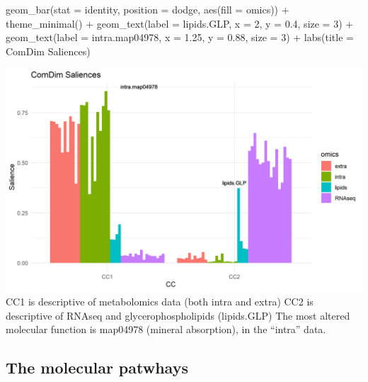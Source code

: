 \documentclass[
]{book}
\newenvironment{Shaded}{\begin{snugshade}}{\end{snugshade}}
\newcommand{\AttributeTok}[1]{\textcolor[rgb]{0.77,0.63,0.00}{#1}}
\newcommand{\DecValTok}[1]{\textcolor[rgb]{0.00,0.00,0.81}{#1}}
\newcommand{\FloatTok}[1]{\textcolor[rgb]{0.00,0.00,0.81}{#1}}
\newcommand{\FunctionTok}[1]{\textcolor[rgb]{0.00,0.00,0.00}{#1}}
\newcommand{\NormalTok}[1]{#1}
\newcommand{\SpecialCharTok}[1]{\textcolor[rgb]{0.00,0.00,0.00}{#1}}
\newcommand{\StringTok}[1]{\textcolor[rgb]{0.31,0.60,0.02}{#1}}
\begin{document}
\begin{Shaded}
\begin{Highlighting}[]
  \FunctionTok{geom\_bar}\NormalTok{(}\AttributeTok{stat =} \StringTok{\textquotesingle{}identity\textquotesingle{}}\NormalTok{, }\AttributeTok{position =} \StringTok{\textquotesingle{}dodge\textquotesingle{}}\NormalTok{,}
           \FunctionTok{aes}\NormalTok{(}\AttributeTok{fill =}\NormalTok{ omics)) }\SpecialCharTok{+}
  \FunctionTok{theme\_minimal}\NormalTok{() }\SpecialCharTok{+}
  \FunctionTok{geom\_text}\NormalTok{(}\AttributeTok{label =} \StringTok{\textquotesingle{}lipids.GLP\textquotesingle{}}\NormalTok{, }\AttributeTok{x =} \DecValTok{2}\NormalTok{, }\AttributeTok{y =} \FloatTok{0.4}\NormalTok{, }\AttributeTok{size =} \DecValTok{3}\NormalTok{) }\SpecialCharTok{+}
  \FunctionTok{geom\_text}\NormalTok{(}\AttributeTok{label =} \StringTok{\textquotesingle{}intra.map04978\textquotesingle{}}\NormalTok{, }\AttributeTok{x =} \FloatTok{1.25}\NormalTok{, }\AttributeTok{y =} \FloatTok{0.88}\NormalTok{, }\AttributeTok{size =} \DecValTok{3}\NormalTok{) }\SpecialCharTok{+}
  \FunctionTok{labs}\NormalTok{(}\AttributeTok{title =} \StringTok{\textquotesingle{}ComDim Saliences\textquotesingle{}}\NormalTok{)}
\end{Highlighting}
\end{Shaded}

\includegraphics{Figs/fig5_2.png}
CC1 is descriptive of metabolomics data (both intra and extra)
CC2 is descriptive of RNAseq and glycerophospholipids (lipids.GLP)
The most altered molecular function is map04978 (mineral absorption),
in the ``intra'' data.

\hypertarget{the-molecular-patwhays}{%
\subsection{The molecular patwhays}\label{the-molecular-patwhays}}
\end{document}
